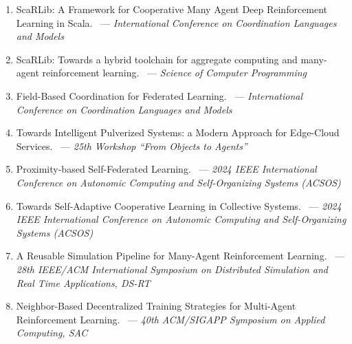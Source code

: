 \documentclass[12pt]{article}
\begin{document}
 \begin{enumerate}
	 \item ScaRLib: A Framework for Cooperative Many Agent Deep Reinforcement 
	  Learning in Scala.~\cite{DBLP:conf/coordination/DominiCAV23} --- \emph{International Conference on Coordination Languages and Models}
	 \item ScaRLib: Towards a hybrid toolchain for aggregate computing and many-agent 
	  reinforcement learning.~\cite{DBLP:journals/scp/DominiCAV24} --- \emph{Science of Computer Programming}
	 \item Field-Based Coordination for Federated Learning.~\cite{DBLP:conf/coordination/DominiAEV24} 
	  --- \emph{International Conference on Coordination Languages and Models}
	 \item Towards Intelligent Pulverized Systems: a Modern Approach 
	  for Edge-Cloud Services.~\cite{DBLP:conf/woa/DominiFAV24} --- \emph{25th Workshop “From Objects to Agents”}
	 \item Proximity-based Self-Federated Learning.~\cite{DBLP:journals/corr/abs-2407-12410} 
	  --- \emph{2024 IEEE International Conference on Autonomic Computing and Self-Organizing Systems (ACSOS)}
	 \item Towards Self-Adaptive Cooperative Learning in Collective Systems.~\cite{DBLP:conf/acsos/Domini24} 
	  --- \emph{2024 IEEE International Conference on Autonomic Computing and Self-Organizing Systems (ACSOS)}
	 \item A Reusable Simulation Pipeline for Many-Agent Reinforcement Learning.~\cite{DBLP:conf/dsrt/DominiAPV24}
	  --- \emph{28th {IEEE/ACM} International Symposium on Distributed Simulation and Real Time Applications, {DS-RT}}
	 \item Neighbor-Based Decentralized Training Strategies for Multi-Agent 
	  Reinforcement Learning.~\cite{DBLP:conf/sac/MalucelliDAV25}
	  --- \emph{40th {ACM/SIGAPP} Symposium on Applied Computing, SAC}
 \end{enumerate}
 
 \sloppypar
\end{document}
